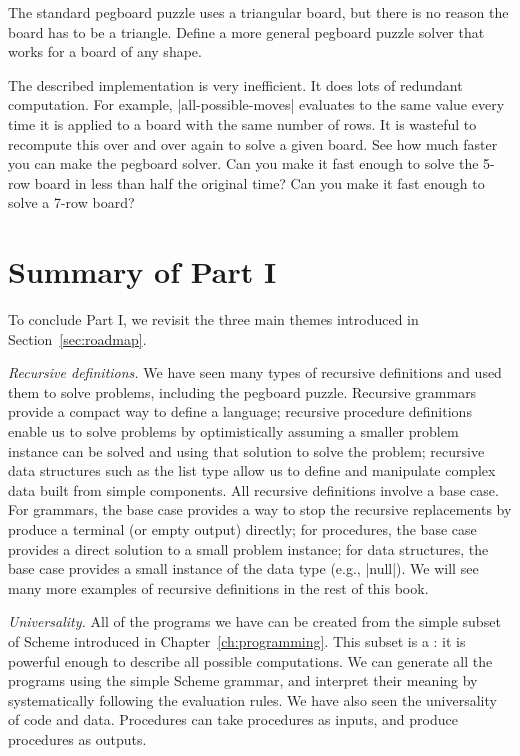 \begin{schemeregion}
{\begin{subexerciselist}
\item \goldstar The standard pegboard puzzle uses a triangular board, but there is no reason the board has to be a triangle.  Define a more general pegboard puzzle solver that works for a board of any 
 shape.

\item \doublegoldstar The described implementation is very inefficient.  It does lots of redundant computation.  For example, \scheme|all-possible-moves| evaluates to the same value every time it is applied to a board with the same number of rows.  It is wasteful to recompute this over and over again to solve a given board.  See how much faster you can make the pegboard solver.  Can you make it fast enough to solve the 5-row board in less than half the original time?  Can you make it fast enough to solve a 7-row board?
\end{subexerciselist}

} %

\section{Summary of Part I}

To conclude Part I, we revisit the three main themes introduced in Section~\ref{sec:roadmap}.

\emph{Recursive definitions.}  We have seen many types of recursive definitions and used them to solve problems, including the pegboard puzzle.  Recursive grammars provide a compact way to define a language; recursive procedure definitions enable us to solve problems by optimistically assuming a smaller problem instance can be solved and using that solution to solve the problem; recursive data structures such as the list type allow us to define and manipulate complex data built from simple components.  All recursive definitions involve a base case.  For grammars, the base case provides a way to stop the recursive replacements by produce a terminal (or empty output) directly; for procedures, the base case provides a direct solution to a small problem instance; for data structures, the base case provides a small instance of the data type (e.g., \scheme|null|).  We will see many more examples of recursive definitions in the rest of this book.

\emph{Universality.} All of the programs we have can be created from the simple subset of Scheme introduced in Chapter~\ref{ch:programming}.  This subset is a : it is powerful enough to describe all possible computations.  We can generate all the programs using the simple Scheme grammar, and interpret their meaning by systematically following the evaluation rules.  We have also seen the universality of code and data.  Procedures can take procedures as inputs, and produce procedures as outputs.  


\end{schemeregion}
